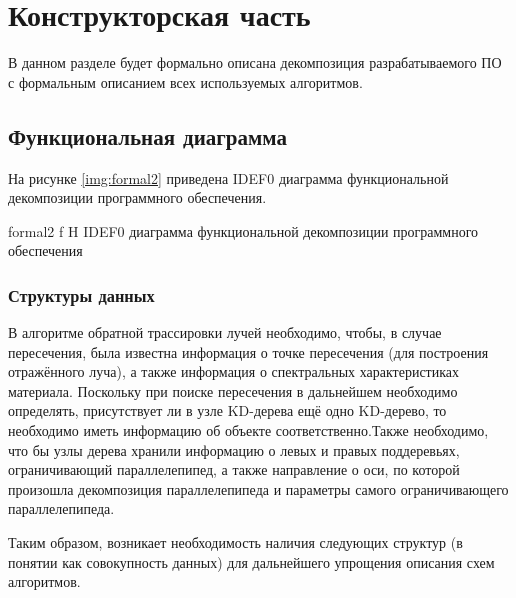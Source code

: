 \chapter{Конструкторская часть}

В данном разделе будет формально описана декомпозиция разрабатываемого ПО с формальным описанием всех используемых алгоритмов.

\section{Функциональная диаграмма}

На рисунке \ref{img:formal2} приведена IDEF0 диаграмма функциональной декомпозиции программного обеспечения.

{formal2}
{f}
{H}
{\textwidth}
{IDEF0 диаграмма функциональной декомпозиции программного обеспечения}


\subsection{Структуры данных}

В алгоритме обратной трассировки лучей необходимо, чтобы, в случае пересечения, была известна информация о точке пересечения (для построения отражённого луча), а также информация о спектральных характеристиках материала. 
Поскольку при поиске пересечения в дальнейшем необходимо определять, присутствует ли в узле KD-дерева ещё одно KD-дерево, то необходимо иметь информацию об объекте соответственно.Также необходимо, что бы узлы дерева хранили информацию о левых и правых поддеревьях, ограничивающий параллелепипед, а также направление о оси, по которой произошла декомпозиция параллелепипеда и параметры самого ограничивающего параллелепипеда.

Таким образом, возникает необходимость наличия следующих структур (в понятии как совокупность данных) для дальнейшего упрощения описания схем алгоритмов.

